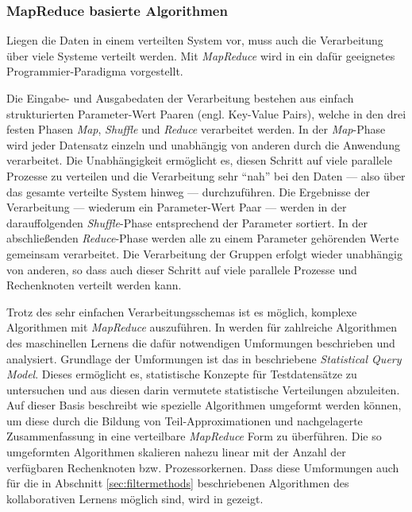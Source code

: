 \subsubsection{MapReduce basierte Algorithmen}\label{sec:mapred}

Liegen die Daten in einem verteilten System vor, muss auch die Verarbeitung über viele Systeme verteilt werden. Mit \textit{MapReduce} wird in \citep{mapred04} ein dafür geeignetes Programmier-Paradigma vorgestellt. 

 Die Eingabe- und Ausgabedaten der Verarbeitung bestehen aus einfach strukturierten Parameter-Wert Paaren (engl. Key-Value Pairs), welche in den drei festen Phasen \textit{Map}, \textit{Shuffle} und \textit{Reduce} verarbeitet werden. In der \textit{Map}-Phase wird jeder Datensatz einzeln und unabhängig von anderen durch die Anwendung verarbeitet. Die Unabhängigkeit ermöglicht es, diesen Schritt auf viele parallele Prozesse zu verteilen und die Verarbeitung sehr ``nah'' bei den Daten --- also über das gesamte verteilte System hinweg --- durchzuführen. Die Ergebnisse der Verarbeitung --- wiederum ein Parameter-Wert Paar --- werden in der darauffolgenden  \textit{Shuffle}-Phase entsprechend der Parameter sortiert. In der abschließenden  \textit{Reduce}-Phase werden alle zu einem Parameter gehörenden Werte gemeinsam verarbeitet. Die Verarbeitung der Gruppen erfolgt wieder unabhängig von anderen, so dass auch dieser Schritt auf viele parallele Prozesse und Rechenknoten verteilt werden kann. \citep{mapred04} 

Trotz des sehr einfachen Verarbeitungsschemas ist es möglich, komplexe Algorithmen mit \textit{MapReduce} auszuführen. In \citep{mapred06} werden für zahlreiche Algorithmen des maschinellen Lernens die dafür notwendigen Umformungen beschrieben und analysiert. Grundlage der Umformungen ist das in \citep{Kearns98} beschriebene \textit{Statistical Query Model}. Dieses ermöglicht es, statistische Konzepte für Testdatensätze zu untersuchen und aus diesen darin vermutete statistische Verteilungen abzuleiten. Auf dieser Basis beschreibt \citep{mapred06} wie spezielle Algorithmen umgeformt werden können, um diese durch die Bildung von Teil-Approximationen und nachgelagerte Zusammenfassung in eine verteilbare \textit{MapReduce} Form zu überführen. Die so umgeformten Algorithmen skalieren nahezu linear mit der Anzahl der verfügbaren Rechenknoten bzw. Prozessorkernen. Dass diese Umformungen auch für die in Abschnitt \ref{sec:filtermethods}  beschriebenen Algorithmen des kollaborativen Lernens möglich sind, wird in \citep{jiang11} gezeigt. \citep{mapred06} 

